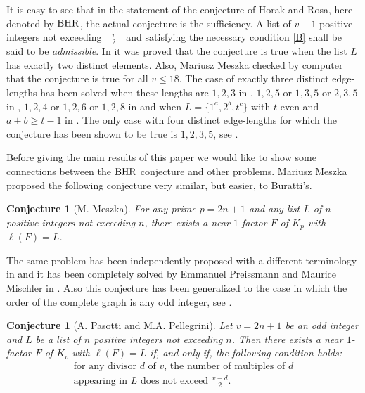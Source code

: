\documentclass{amsart}
\newtheorem{conj}[prop]{Conjecture}
\theoremstyle{definition}
\numberwithin{equation}{section}
\def\BHR{\mathop{\rm BHR}}
\begin{document}
It is easy to see that in the statement of the conjecture of Horak and Rosa,
here denoted by $\BHR$, the actual conjecture is the sufficiency.
A list of $v-1$ positive integers not exceeding $\left\lfloor\frac{v}{2}\right\rfloor$ 
and satisfying the necessary condition \eqref{B} shall be said to be \emph{admissible}.
In \cite{HR} it was proved that the conjecture is true when the list $L$ has exactly two distinct elements.
Also, Mariusz Meszka checked by computer that the conjecture is true for all $v\leq 18$.
The case of exactly three distinct edge-lengths has been solved when these lengths are $1,2,3$ in \cite{CDF},
$1,2,5$ or $1,3,5$ or $2,3,5$ in \cite{PP1}, $1,2,4$ or $1,2,6$ or $1,2,8$ in \cite{PPnew}
and when  $L=\{1^a,2^b,t^c\}$ with $t$ even and $a+b\geq t-1$ in \cite{PPnew}.
The only case with four distinct edge-lengths for which the conjecture has been shown to be true is $1,2,3,5$, see \cite{PP1}.


Before giving the main results of this paper we would like to show some
connections between the $\BHR$ conjecture and other problems.
Mariusz Meszka proposed the following conjecture very similar, but easier, to Buratti's.


\begin{conj}[M. Meszka]
For any prime $p=2n+1$
and any list $L$ of $n$ positive integers not exceeding $n$, there exists a
near $1$-factor  $F$ of $K_p$ with $\ell(F)=L$.
\end{conj}

The same problem has been independently  proposed with a different terminology in \cite{B} and it has been completely solved by Emmanuel Preissmann and Maurice Mischler in \cite{PM}.
Also this conjecture has been generalized to the case in which the order of the complete graph is any odd integer, see
\cite{PPMeszka}.

\begin{conj}[A. Pasotti and M.A. Pellegrini]
Let $v=2n+1$ be an odd integer and $L$ be a list   of $n$ positive integers not exceeding $n$. Then there exists a
near $1$-factor  $F$ of $K_v$ with $\ell(F)=L$ if, and only if, the following condition holds:
\begin{equation*}
\left. \begin{array}{c}
\textrm{for any divisor $d$ of $v$, the number of multiples of $d$} \\
\textrm{appearing in $L$ does not exceed $\frac{v-d}{2}$.}
\end{array}\right.
\end{equation*}
\end{conj}
\end{document}
